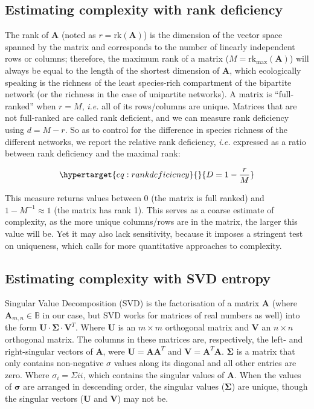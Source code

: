 \documentclass[10pt,oneside]{article}
\begin{document}
\hypertarget{estimating-complexity-with-rank-deficiency}{%
\subsection{Estimating complexity with rank
deficiency}\label{estimating-complexity-with-rank-deficiency}}

The rank of \(\mathbf{A}\) (noted as \(r = \text{rk}(\mathbf{A})\)) is
the dimension of the vector space spanned by the matrix and corresponds
to the number of linearly independent rows or columns; therefore, the
maximum rank of a matrix (\(M = \text{rk}_{\text{max}}(\mathbf{A})\))
will always be equal to the length of the shortest dimension of
\(\mathbf{A}\), which ecologically speaking is the richness of the least
species-rich compartment of the bipartite network (or the richness in
the case of unipartite networks). A matrix is ``full-ranked'' when
\(r=M\), \emph{i.e.} all of its rows/columns are unique. Matrices that
are not full-ranked are called rank deficient, and we can measure rank
deficiency using \(d = M-r\). So as to control for the difference in
species richness of the different networks, we report the relative rank
deficiency, \emph{i.e.} expressed as a ratio between rank deficiency and
the maximal rank:

\begin{equation}\protect\hypertarget{eq:rankdeficiency}{}{D = 1-\frac{r}{M}}\label{eq:rankdeficiency}\end{equation}

This measure returns values between 0 (the matrix is full ranked) and
\(1-M^{-1} \approx 1\) (the matrix has rank 1). This serves as a coarse
estimate of complexity, as the more unique columns/rows are in the
matrix, the larger this value will be. Yet it may also lack sensitivity,
because it imposes a stringent test on uniqueness, which calls for more
quantitative approaches to complexity.

\hypertarget{estimating-complexity-with-svd-entropy}{%
\subsection{Estimating complexity with SVD
entropy}\label{estimating-complexity-with-svd-entropy}}

Singular Value Decomposition (SVD) is the factorisation of a matrix
\(\mathbf{A}\) (where \(\mathbf{A}_{m,n} \in\mathbb{B}\) in our case,
but SVD works for matrices of real numbers as well) into the form
\(\mathbf{U}\cdot\mathbf{\Sigma}\cdot \mathbf{V}^T\). Where
\(\mathbf{U}\) is an \(m \times m\) orthogonal matrix and \(\mathbf{V}\)
an \(n \times n\) orthogonal matrix. The columns in these matrices are,
respectively, the left- and right-singular vectors of \(\mathbf{A}\),
were \(\mathbf{U} = \mathbf{A}\mathbf{A}^T\) and
\(\mathbf{V} = \mathbf{A}^T\mathbf{A}\). \(\mathbf{\Sigma}\) is a matrix
that only contains non-negative \(\sigma\) values along its diagonal and
all other entries are zero. Where \(\sigma_{i} = \Sigma{ii}\), which
contains the singular values of \(\mathbf{A}\). When the values of
\(\mathbf{\sigma}\) are arranged in descending order, the singular
values (\(\mathbf{\Sigma}\)) are unique, though the singular vectors
(\(\mathbf{U}\) and \(\mathbf{V}\)) may not be.
\end{document}
